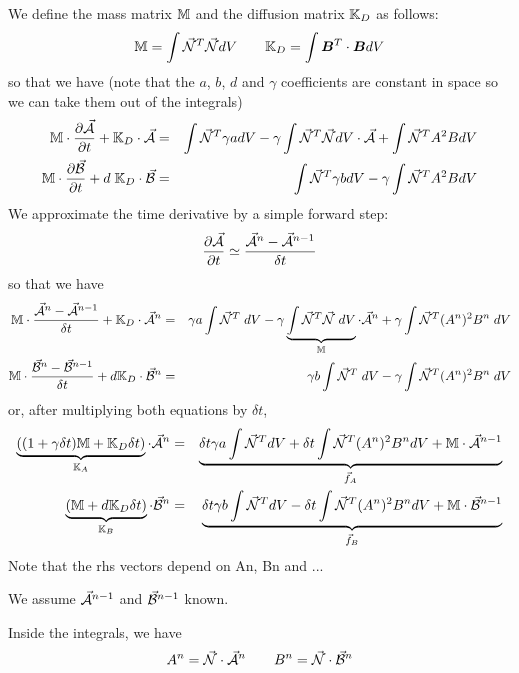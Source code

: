 We define the mass matrix ${\mathbb{M}}$ and the diffusion matrix ${\mathbb{K}}_D$ as follows:
\[
{{\mathbb{M}}} = 
\int \vec{{\mathcal{N}}}^T \vec{{\mathcal{N}}} dV 
\qquad
{\mathbb{K}}_D = 
\int {\bm B}^T \cdot {\bm B} dV  
\]
so that we have (note that  the $a$, $b$, $d$ and $\gamma$ coefficients are
constant in space so we can take them out of the integrals)
\begin{eqnarray}
{{\mathbb{M}}} \cdot  \frac{\partial \vec{\cal A}}{\partial t} + 
{\mathbb{K}}_D \cdot \vec{\cal A} 
&=& \int \vec{{\mathcal{N}}}^T \gamma a dV 
- \gamma \int \vec{{\mathcal{N}}}^T \vec{{\mathcal{N}}} dV \cdot \vec{\cal A}
+ \int \vec{{\mathcal{N}}}^T A^2 B dV  \nonumber\\
{{\mathbb{M}}} \cdot  \frac{\partial \vec{\cal B}}{\partial t} + 
d\; {\mathbb{K}}_D \cdot \vec{\cal B} 
&=& \int \vec{{\mathcal{N}}}^T \gamma b dV 
- \gamma \int \vec{{\mathcal{N}}}^T A^2 B dV 
\end{eqnarray}
We approximate the time derivative by a simple forward step:
\[
\frac{\partial \vec{\cal A}}{\partial t}  \simeq
\frac{ \vec{\cal A}^n - \vec{\cal A}^{n-1}  }{\delta t} 
\]
so that we have
\begin{eqnarray}
{{\mathbb{M}}} \cdot \frac{ \vec{\cal A}^n - \vec{\cal A}^{n-1}  }{\delta t}  +
{\mathbb{K}}_D \cdot \vec{\cal A}^n 
&=& \gamma a\int \vec{{\mathcal{N}}}^T \;  dV 
- \gamma \underbrace{\int \vec{{\mathcal{N}}}^T \vec{{\mathcal{N}}} \; dV}_{{\mathbb{M}}} \cdot \vec{\cal A}^n
+ \gamma \int \vec{{\mathcal{N}}}^T (A^n)^2 B^n \; dV  \nonumber\\
{{\mathbb{M}}} \cdot \frac{ \vec{\cal B}^n - \vec{\cal B}^{n-1}  }{\delta t}  +
d {\mathbb{K}}_D \cdot \vec{\cal B}^n 
&=& \gamma b\int \vec{{\mathcal{N}}}^T \; dV 
- \gamma \int \vec{{\mathcal{N}}}^T (A^n)^2 B^n \; dV 
\end{eqnarray}
or, after multiplying both equations by $\delta t$,
\begin{eqnarray}
\underbrace{
((1+\gamma \delta t) {{\mathbb{M}}} + {\mathbb{K}}_D  \delta t )}_{{\mathbb{K}}_A} \cdot \vec{\cal A}^n 
&=& 
\underbrace{\delta t \gamma a \int \vec{{\mathcal{N}}}^T  dV 
+ \delta t\int \vec{{\mathcal{N}}}^T (A^n)^2 B^n dV  
+ {{\mathbb{M}}} \cdot \vec{\cal A}^{n-1}}_{\vec{f}_A}
\nonumber\\
\underbrace{({\mathbb{M}} + d {\mathbb{K}}_D \delta t)}_{{\mathbb{K}}_B} \cdot \vec{\cal B}^n 
&=& 
\underbrace{
\delta t \gamma b \int \vec{{\mathcal{N}}}^T dV 
- \delta t\int \vec{{\mathcal{N}}}^T (A^n)^2 B^n dV 
+ {{\mathbb{M}}} \cdot \vec{\cal B}^{n-1}}_{\vec{f}_B}
\end{eqnarray}
Note that the rhs vectors depend on An, Bn and ...

We assume $\vec{\cal A}^{n-1}$ and $\vec{\cal B}^{n-1}$ known. 


Inside the integrals, we have
\[
A^n = \vec{\cal N}\cdot \vec{\cal A}^n
\qquad 
B^n = \vec{\cal N}\cdot \vec{\cal B}^n
\]



